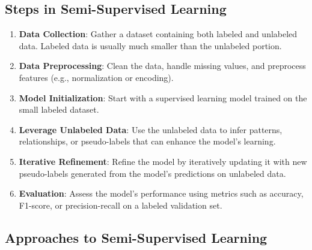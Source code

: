 \subsection*{Steps in Semi-Supervised Learning}

\begin{enumerate}
    \item \textbf{Data Collection}:
    Gather a dataset containing both labeled and unlabeled data. Labeled data is usually much smaller than the unlabeled portion.
    \item \textbf{Data Preprocessing}:
    Clean the data, handle missing values, and preprocess features (e.g., normalization or encoding).
    \item \textbf{Model Initialization}:
    Start with a supervised learning model trained on the small labeled dataset.
    \item \textbf{Leverage Unlabeled Data}:
    Use the unlabeled data to infer patterns, relationships, or pseudo-labels that can enhance the model's learning.
    \item \textbf{Iterative Refinement}:
    Refine the model by iteratively updating it with new pseudo-labels generated from the model's predictions on unlabeled data.
    \item \textbf{Evaluation}:
    Assess the model’s performance using metrics such as accuracy, F1-score, or precision-recall on a labeled validation set.
\end{enumerate}

\subsection*{Approaches to Semi-Supervised Learning}

